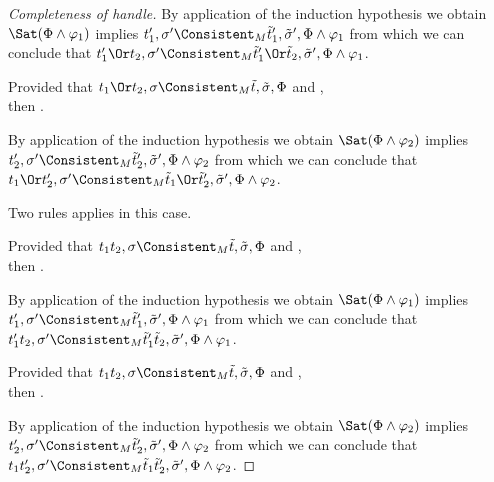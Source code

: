 \begin{proof}[Completeness of handle]
{{      By application of the induction hypothesis we obtain $\Sat(\Phi\land\phi_1)$ implies $t_1',\sigma'\Consistent_{M}\tilde{t}_1',\tilde{\sigma}',\Phi\land\phi_1$
      from which we can conclude that $t_1'\Or t_2,\sigma'\Consistent_{M}\tilde{t}_1'\Or\tilde{t}_2,\tilde{\sigma}',\Phi\land\phi_1$.
      }
      {
      Provided that $t_1\Or t_2,\sigma\Consistent_{M}\tilde{t},\tilde{\sigma},\Phi$ and ,\\
      then .

      By application of the induction hypothesis we obtain $\Sat(\Phi\land\phi_2)$ implies $t_2',\sigma'\Consistent_{M}\tilde{t}_2',\tilde{\sigma}',\Phi\land\phi_2$
      from which we can conclude that $t_1\Or t_2',\sigma'\Consistent_{M}\tilde{t}_1\Or\tilde{t}_2',\tilde{\sigma}',\Phi\land\phi_2$.
      }
      }
      {
      Two rules applies in this case.\\
      {
      Provided that $t_1\And t_2,\sigma\Consistent_{M}\tilde{t},\tilde{\sigma},\Phi$ and ,\\
      then .

      By application of the induction hypothesis we obtain $\Sat(\Phi\land\phi_1)$ implies $t_1',\sigma'\Consistent_{M}\tilde{t}_1',\tilde{\sigma}',\Phi\land\phi_1$
      from which we can conclude that $t_1'\And t_2,\sigma'\Consistent_{M}\tilde{t}_1'\And\tilde{t}_2,\tilde{\sigma}',\Phi\land\phi_1$.
      }
      {
      Provided that $t_1\And t_2,\sigma\Consistent_{M}\tilde{t},\tilde{\sigma},\Phi$ and ,\\
      then .

      By application of the induction hypothesis we obtain $\Sat(\Phi\land\phi_2)$ implies $t_2',\sigma'\Consistent_{M}\tilde{t}_2',\tilde{\sigma}',\Phi\land\phi_2$
      from which we can conclude that $t_1\And t_2',\sigma'\Consistent_{M}\tilde{t}_1\And\tilde{t}_2',\tilde{\sigma}',\Phi\land\phi_2$.
      }
      }
\end{proof}

